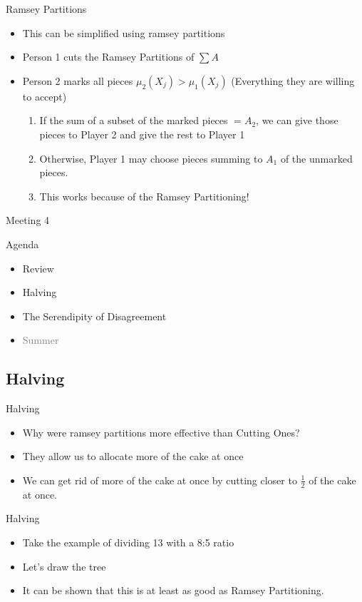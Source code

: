 \documentclass[aspectratio=169,xcolor=dvipsnames]{beamer}
\begin{document}
\begin{frame}{Ramsey Partitions}
	\begin{itemize}
		\item This can be simplified using ramsey partitions
		\item Person 1 cuts the Ramsey Partitions of $\sum A$
		\item Person 2 marks all pieces $\mu_2(X_j) > \mu_1(X_j)$ (Everything they are willing to accept)\pause
		\begin{enumerate}
			\item If the sum of a subset of the marked pieces $= A_2$, we can give those pieces to Player 2 and give the rest to Player 1\pause 
			\item Otherwise, Player 1 may choose pieces summing to $A_1$ of the unmarked pieces. 
			\item This works because of the Ramsey Partitioning!
		\end{enumerate}
	\end{itemize}
\end{frame}
\begin{frame}{Meeting 4}
	\begin{block}{Agenda}
		\begin{itemize}
			\item Review
			\item Halving
			\item The Serendipity of Disagreement
			\item \textcolor{Gray}{Summer}
		\end{itemize}
	\end{block}
\end{frame}
\subsection{Halving}
\begin{frame}{Halving}
	\begin{itemize}
		\item Why were ramsey partitions more effective than Cutting Ones? \pause
		\item They allow us to allocate more of the cake at once \pause
		\item We can get rid of more of the cake at once by cutting closer to $\frac{1}{2}$ of the cake at once.
	\end{itemize}
\end{frame}
\begin{frame}{Halving}
	\begin{itemize}
		\item Take the example of dividing 13 with a 8:5 ratio \pause
		\item Let's draw the tree \pause
		\item It can be shown that this is at least as good as Ramsey Partitioning.
	\end{itemize}
\end{frame}
\end{document}
